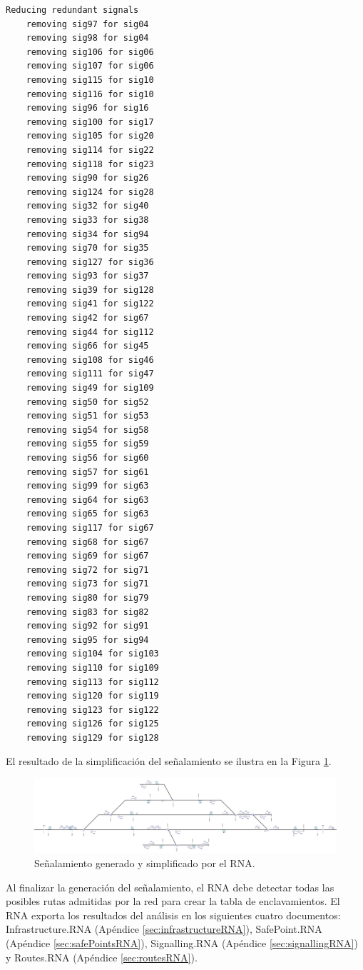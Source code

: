 \begin{lstlisting}[language = {}, tabsize=4, basicstyle=\footnotesize\ttfamily, showspaces=false, showstringspaces=false, caption = Reducción de señalamiento por prioridad de señales, label = {lst:EJ4_3}]
	Reducing redundant signals
	removing sig97 for sig04
	removing sig98 for sig04
	removing sig106 for sig06
	removing sig107 for sig06
	removing sig115 for sig10
	removing sig116 for sig10
	removing sig96 for sig16
	removing sig100 for sig17
	removing sig105 for sig20
	removing sig114 for sig22
	removing sig118 for sig23
	removing sig90 for sig26
	removing sig124 for sig28
	removing sig32 for sig40
	removing sig33 for sig38
	removing sig34 for sig94
	removing sig70 for sig35
	removing sig127 for sig36
	removing sig93 for sig37
	removing sig39 for sig128
	removing sig41 for sig122
	removing sig42 for sig67
	removing sig44 for sig112
	removing sig66 for sig45
	removing sig108 for sig46
	removing sig111 for sig47
	removing sig49 for sig109
	removing sig50 for sig52
	removing sig51 for sig53
	removing sig54 for sig58
	removing sig55 for sig59
	removing sig56 for sig60
	removing sig57 for sig61
	removing sig99 for sig63
	removing sig64 for sig63
	removing sig65 for sig63
	removing sig117 for sig67
	removing sig68 for sig67
	removing sig69 for sig67
	removing sig72 for sig71
	removing sig73 for sig71
	removing sig80 for sig79
	removing sig83 for sig82
	removing sig92 for sig91
	removing sig95 for sig94
	removing sig104 for sig103
	removing sig110 for sig109
	removing sig113 for sig112
	removing sig120 for sig119
	removing sig123 for sig122
	removing sig126 for sig125
	removing sig129 for sig128
\end{lstlisting}

	El resultado de la simplificación del señalamiento se ilustra en la Figura \ref{fig:EJ4_7}.
	
	\begin{figure}[H]
		\centering
		\includegraphics[width=1\textwidth]{resultados-obtenidos/ejemplo4/images/4_RNA.png}
		\centering\caption{Señalamiento generado y simplificado por el RNA.}
		\label{fig:EJ4_7}
	\end{figure}
	
	Al finalizar la generación del señalamiento, el RNA debe detectar todas las posibles rutas admitidas por la red para crear la tabla de enclavamientos. El RNA exporta los resultados del análisis en los siguientes cuatro documentos: Infrastructure.RNA (Apéndice \ref{sec:infrastructureRNA}), SafePoint.RNA (Apéndice \ref{sec:safePointsRNA}), Signalling.RNA (Apéndice \ref{sec:signallingRNA}) y Routes.RNA (Apéndice \ref{sec:routesRNA}).